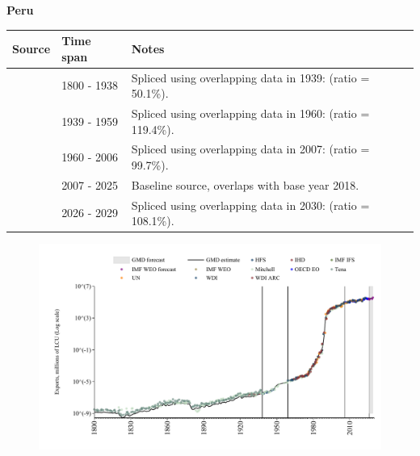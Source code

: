 \documentclass[12pt,a4paper,landscape]{article}
\begin{document}
\begin{adjustbox}{max totalsize={\paperwidth}{\paperheight},center}
\begin{minipage}[t][\textheight][t]{\textwidth}
\vspace*{0.5cm}
{}
\begin{center}
{\Large\bfseries Peru}
\end{center}
\vspace{0.5cm}
\begin{table}[H]
\centering
\small
\begin{tabular}{|l|l|l|}
\hline
\textbf{Source} & \textbf{Time span} & \textbf{Notes} \\
\hline
\rowcolor{white}\cite{Tena}& 1800 - 1938 &Spliced using overlapping data in 1939: (ratio = 50.1\%).\\
\rowcolor{lightgray}\cite{Mitchell}& 1939 - 1959 &Spliced using overlapping data in 1960: (ratio = 119.4\%).\\
\rowcolor{white}\cite{WDI}& 1960 - 2006 &Spliced using overlapping data in 2007: (ratio = 99.7\%).\\
\rowcolor{lightgray}\cite{OECD_EO}& 2007 - 2025 &Baseline source, overlaps with base year 2018.\\
\rowcolor{white}\cite{IMF_WEO_forecast}& 2026 - 2029 &Spliced using overlapping data in 2030: (ratio = 108.1\%).\\
\hline
\end{tabular}
\end{table}
\begin{figure}[H]
\centering
\includegraphics[width=\textwidth,height=0.6\textheight,keepaspectratio]{graphs/PER_exports.pdf}
\end{figure}
\end{minipage}
\end{adjustbox}
\end{document}
